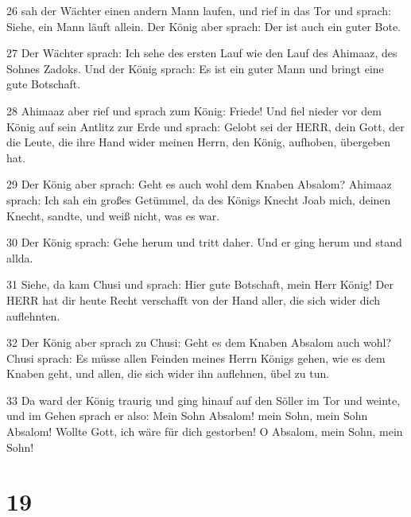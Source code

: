 \par 26 sah der Wächter einen andern Mann laufen, und rief in das Tor und sprach: Siehe, ein Mann läuft allein. Der König aber sprach: Der ist auch ein guter Bote.
\par 27 Der Wächter sprach: Ich sehe des ersten Lauf wie den Lauf des Ahimaaz, des Sohnes Zadoks. Und der König sprach: Es ist ein guter Mann und bringt eine gute Botschaft.
\par 28 Ahimaaz aber rief und sprach zum König: Friede! Und fiel nieder vor dem König auf sein Antlitz zur Erde und sprach: Gelobt sei der HERR, dein Gott, der die Leute, die ihre Hand wider meinen Herrn, den König, aufhoben, übergeben hat.
\par 29 Der König aber sprach: Geht es auch wohl dem Knaben Absalom? Ahimaaz sprach: Ich sah ein großes Getümmel, da des Königs Knecht Joab mich, deinen Knecht, sandte, und weiß nicht, was es war.
\par 30 Der König sprach: Gehe herum und tritt daher. Und er ging herum und stand allda.
\par 31 Siehe, da kam Chusi und sprach: Hier gute Botschaft, mein Herr König! Der HERR hat dir heute Recht verschafft von der Hand aller, die sich wider dich auflehnten.
\par 32 Der König aber sprach zu Chusi: Geht es dem Knaben Absalom auch wohl? Chusi sprach: Es müsse allen Feinden meines Herrn Königs gehen, wie es dem Knaben geht, und allen, die sich wider ihn auflehnen, übel zu tun.
\par 33 Da ward der König traurig und ging hinauf auf den Söller im Tor und weinte, und im Gehen sprach er also: Mein Sohn Absalom! mein Sohn, mein Sohn Absalom! Wollte Gott, ich wäre für dich gestorben! O Absalom, mein Sohn, mein Sohn!

\chapter{19}

